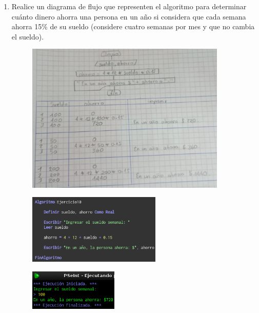 \documentclass[12pt]{article}
\begin{document}
\begin{enumerate}
            \item Realice un diagrama de flujo que representen el algoritmo para determinar cuánto dinero ahorra una persona en un año si considera que cada semana ahorra 15\% de su sueldo (considere cuatro semanas por mes y que no cambia el sueldo).
        
                \begin{figure}[!h]
                    \centering
                    \includegraphics[width=0.9\textwidth]{Img/DF_ej10.jpeg}
                \end{figure}

                \newpage
                \begin{figure}[!h]
                    \centering
                    \includegraphics[width=0.6\textwidth]{Img/Cod_ej10.png}
                \end{figure}

                \begin{figure}[!h]
                    \centering
                    \includegraphics[width=0.4\textwidth]{Img/Ejec_ej10.png}
                \end{figure}
        
        \end{enumerate}
\end{document}

